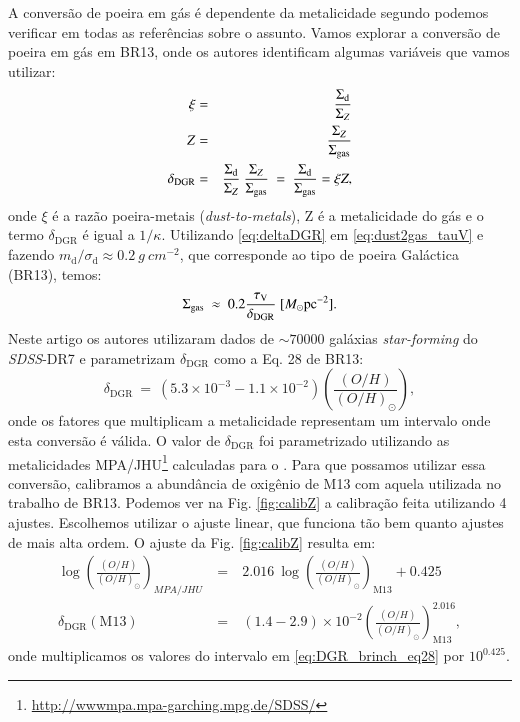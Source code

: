 A conversão de poeira em gás é dependente da metalicidade segundo podemos verificar em todas as
referências sobre o assunto. Vamos explorar a conversão de poeira em gás em BR13, onde os autores
identificam algumas variáveis que vamos utilizar:
\begin{eqnarray}
	\xi &=& \frac{\Sigma_{\mathrm{d}}}{\Sigma_Z} \\
	Z &=& \frac{\Sigma_Z}{\Sigma_{\mathrm{gas}}}  \\
	\delta_{\mathrm{DGR}} &=& \frac{\Sigma_{\mathrm{d}}}{\Sigma_Z}\ \frac{\Sigma_Z}{\Sigma_{\mathrm{gas}}}\ =\
\frac{\Sigma_{\mathrm{d}}}{\Sigma_{\mathrm{gas}}} = \xi Z,
	\label{eq:deltaDGR}
\end{eqnarray}
\noindent onde $\xi$ é a razão poeira-metais ({\em dust-to-metals}), Z é a metalicidade do gás e o
termo $\delta_{\mathrm{DGR}}$ é igual a $1/\kappa$. Utilizando \eqref{eq:deltaDGR} em
\eqref{eq:dust2gas_tauV} e fazendo $m_{\mathrm{d}}/\sigma_{\mathrm{d}} \approx 0.2\ g\ cm^{-2}$, que
corresponde ao tipo de poeira Galáctica (BR13), temos:
\begin{equation}
	\Sigma_{\mathrm{gas}}\ \approx\ 0.2 \frac{\tau_{\mathrm{V}}}{\delta_{\mathrm{DGR}}}\ [M_\odot \mathrm{pc}^{-2}].
	\label{eq:SigmaGasBR}
\end{equation}
Neste artigo os autores utilizaram dados de $\sim 70000$ galáxias {\em star-forming} do
\textit{SDSS}-DR7 e parametrizam $\delta_{\mathrm{DGR}}$ como a Eq. 28 de BR13:
\begin{equation}
	\delta_{\mathrm{DGR}}\ =\ (5.3 \times 10^{-3} - 1.1 \times 10^{-2})
\left(\frac{(O/H)}{(O/H)_\odot}\right),
	\label{eq:DGR_brinch_eq28}
\end{equation}
\noindent onde os fatores que multiplicam a metalicidade representam um intervalo onde esta
conversão é válida. O valor de $\delta_{\mathrm{DGR}}$ foi parametrizado utilizando as metalicidades
MPA/JHU\footnote{\href{http://wwwmpa.mpa-garching.mpg.de/SDSS/}{http://wwwmpa.mpa-garching.mpg.de/SDSS/}}
calculadas para o \SDSS. Para que possamos utilizar essa conversão, calibramos a abundância de
oxigênio de M13 com aquela utilizada no trabalho de BR13. Podemos ver na Fig. \ref{fig:calibZ} a
calibração feita utilizando 4 ajustes. Escolhemos utilizar o ajuste linear, que funciona tão bem
quanto ajustes de mais alta ordem. O ajuste da Fig. \ref{fig:calibZ} resulta em:
\begin{eqnarray}
	\label{eq:myZ}
	\log \left(\frac{(O/H)}{(O/H)_\odot}\right)_{MPA/JHU}\ &=&\ 2.016\ \log
\left(\frac{(O/H)}{(O/H)_\odot}\right)_{\mathrm{M}13} + 0.425 \\
	\label{eq:myDGR}	
	\delta_{\mathrm{DGR}}(\mathrm{M}13)\ &=&\ (1.4 - 2.9) \times 10^{-2}
\left(\frac{(O/H)}{(O/H)_\odot}\right)^{2.016}_{\mathrm{M}13},
\end{eqnarray}
\noindent onde multiplicamos os valores do intervalo em \eqref{eq:DGR_brinch_eq28} por $10^{0.425}$.

